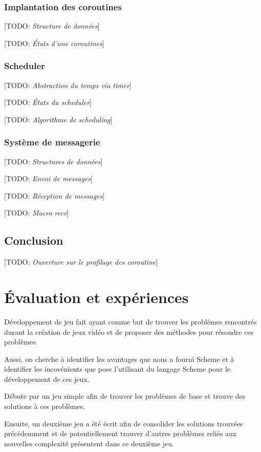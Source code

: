 \documentclass[12pt,oneside,letterpaper,francais]{book}
\newcommand{\todo}[1]{[TODO: {\it #1}]}
\begin{document}
\subsection{Implantation des coroutines}

\todo{Structure de données}

\todo{États d'une coroutines}

\subsection{Scheduler}
\todo{Abstraction du temps via timer}

\todo{États du scheduler}

\todo{Algorithme de scheduling}

\subsection{Système de messagerie}
\todo{Structures de données}

\todo{Envoi de messages}

\todo{Réception de messages}

\todo{Macro recv}


\section{Conclusion}
\todo{Ouverture sur le profilage des coroutine}


\chapter{Évaluation et expériences}

Développement de jeu fait ayant comme but de trouver les problèmes
rencontrés durant la création de jeux vidéo et de proposer des
méthodes pour résoudre ces problèmes.

Aussi, on cherche à identifier les avantages que nous a fourni Scheme
et à identifier les incovénients que pose l'utilisant du langage
Scheme pour le développement de ces jeux.

Débute par un jeu simple afin de trouver les problèmes de base et
trouve des solutions à ces problèmes.

Ensuite, un deuxième jeu a été écrit afin de consolider les solutions
trouvées précédemment et de potentiellement trouver d'autres problèmes
reliés aux nouvelles complexité présentent dans ce deuxième jeu.
\end{document}
